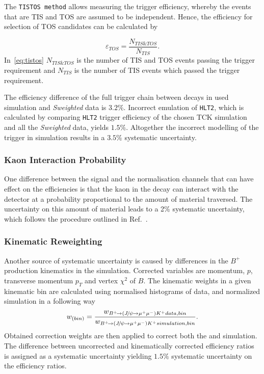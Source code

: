 The \texttt{TISTOS method} allows measuring the trigger efficiency, whereby the events that are \gls{TIS} and \gls{TOS} are assumed to be independent. Hence, the efficiency
for selection of \gls{TOS} candidates can be calculated by

\begin{equation}
\varepsilon_{TOS} = \frac{N_{TIS\&TOS}}{N_{TIS}}.
\label{eq:tistos}
\end{equation}
In~\autoref{eq:tistos} $N_{TIS\&TOS}$ is the number of \gls{TIS} and \gls{TOS} events passing the trigger requirement and $N_{TIS}$ is the number of \gls{TIS} events which passed the trigger requirement.

The efficiency difference of the full trigger chain between \bjpsik decays in used simulation and \textit{Sweighted} data is $3.2\%$. Incorrect emulation of \texttt{HLT2}, which is calculated by comparing \texttt{HLT2} trigger efficiency of the chosen TCK simulation and all the \textit{Sweighted} data, yields $1.5\%$. Altogether the incorrect modelling of the trigger in simulation results in a $3.5\%$ systematic uncertainty.

\subsubsection{Kaon Interaction Probability}
One difference between the signal and the normalisation channels that can have effect on the efficiencies is that the kaon in the decay \bjpsimumuk can interact with the detector at a probability proportional to the amount of material traversed. The uncertainty on this amount of material leads to a 2\% systematic
uncertainty, which follows the procedure outlined in Ref.~\cite{LHCb-DP-2013-002}.

\subsubsection{Kinematic Reweighting}
Another source of systematic uncertainty is caused by differences in the $B^{+}$ production kinematics in the simulation. Corrected variables are momentum, $p$, transverse momentum $p_{T}$ and vertex $\chi^{2}$ of $B$. The kinematic weights in a given kinematic bin are calculated using normalised histograms of \bjpsimumuk data, and normalized \bjpsimumuk simulation in a following way
\begin{equation}
w_{(bin)} =  \frac{w_{{{{B}^+}}\!\rightarrow ({{J\mskip -3mu/\mskip -2mu\psi\mskip 2mu}}\!\rightarrow {\ensuremath{\mu^+\mu^-}}){{K}^+} data,bin}}{w_{{{{B}^+}}\!\rightarrow ({{J\mskip -3mu/\mskip -2mu\psi\mskip 2mu}}\!\rightarrow {\ensuremath{\mu^+\mu^-}}){{K}^+} simulation,bin}}.
\end{equation}
Obtained correction weights are then applied to correct both the \bjpsimumuk and \Bmumumu simulation. The difference between uncorrected and kinematically corrected efficiency ratios is assigned as a systematic uncertainty yielding $1.5\%$ systematic uncertainty on the efficiency ratios.

